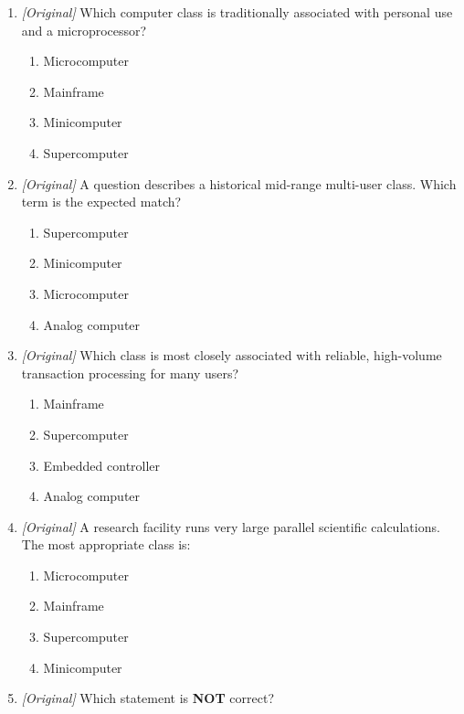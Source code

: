 \documentclass[11pt]{article}
\begin{document}
\begin{enumerate}[label=\textbf{Q\arabic*.}, leftmargin=*]
  called:
  \begin{enumerate}[label=\Alph*.]
    \item Analog
    \item Mainframe
    \item Hybrid
    \item Supercomputer
  \end{enumerate}
\item \textit{[Original]} Which computer class is traditionally associated
  with personal use and a microprocessor?
  \begin{enumerate}[label=\Alph*.]
    \item Microcomputer
    \item Mainframe
    \item Minicomputer
    \item Supercomputer
  \end{enumerate}
\item \textit{[Original]} A question describes a historical mid-range
  multi-user class. Which term is the expected match?
  \begin{enumerate}[label=\Alph*.]
    \item Supercomputer
    \item Minicomputer
    \item Microcomputer
    \item Analog computer
  \end{enumerate}
\item \textit{[Original]} Which class is most closely associated with
  reliable, high-volume transaction processing for many users?
  \begin{enumerate}[label=\Alph*.]
    \item Mainframe
    \item Supercomputer
    \item Embedded controller
    \item Analog computer
  \end{enumerate}
\item \textit{[Original]} A research facility runs very large parallel
  scientific calculations. The most appropriate class is:
  \begin{enumerate}[label=\Alph*.]
    \item Microcomputer
    \item Mainframe
    \item Supercomputer
    \item Minicomputer
  \end{enumerate}
\item \textit{[Original]} Which statement is \textbf{NOT} correct?

\end{enumerate}
\end{document}
